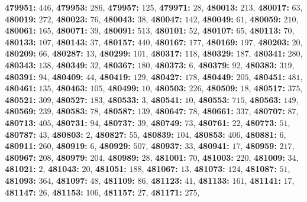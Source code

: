 \textsf{\bfseries 479951:} $446$, \textsf{\bfseries 479953:} $286$, \textsf{\bfseries 479957:} $125$, \textsf{\bfseries 479971:} $28$, \textsf{\bfseries 480013:} $213$, \textsf{\bfseries 480017:} $63$, \textsf{\bfseries 480019:} $272$, \textsf{\bfseries 480023:} $76$, \textsf{\bfseries 480043:} $38$, \textsf{\bfseries 480047:} $142$, \textsf{\bfseries 480049:} $61$, \textsf{\bfseries 480059:} $210$, \textsf{\bfseries 480061:} $165$, \textsf{\bfseries 480071:} $39$, \textsf{\bfseries 480091:} $513$, \textsf{\bfseries 480101:} $52$, \textsf{\bfseries 480107:} $65$, \textsf{\bfseries 480113:} $70$, \textsf{\bfseries 480133:} $107$, \textsf{\bfseries 480143:} $37$, \textsf{\bfseries 480157:} $440$, \textsf{\bfseries 480167:} $177$, \textsf{\bfseries 480169:} $197$, \textsf{\bfseries 480203:} $20$, \textsf{\bfseries 480209:} $66$, \textsf{\bfseries 480287:} $13$, \textsf{\bfseries 480299:} $101$, \textsf{\bfseries 480317:} $118$, \textsf{\bfseries 480329:} $187$, \textsf{\bfseries 480341:} $280$, \textsf{\bfseries 480343:} $138$, \textsf{\bfseries 480349:} $32$, \textsf{\bfseries 480367:} $180$, \textsf{\bfseries 480373:} $6$, \textsf{\bfseries 480379:} $92$, \textsf{\bfseries 480383:} $319$, \textsf{\bfseries 480391:} $94$, \textsf{\bfseries 480409:} $44$, \textsf{\bfseries 480419:} $129$, \textsf{\bfseries 480427:} $178$, \textsf{\bfseries 480449:} $205$, \textsf{\bfseries 480451:} $481$, \textsf{\bfseries 480461:} $135$, \textsf{\bfseries 480463:} $105$, \textsf{\bfseries 480499:} $10$, \textsf{\bfseries 480503:} $226$, \textsf{\bfseries 480509:} $18$, \textsf{\bfseries 480517:} $375$, \textsf{\bfseries 480521:} $309$, \textsf{\bfseries 480527:} $183$, \textsf{\bfseries 480533:} $3$, \textsf{\bfseries 480541:} $10$, \textsf{\bfseries 480553:} $715$, \textsf{\bfseries 480563:} $149$, \textsf{\bfseries 480569:} $239$, \textsf{\bfseries 480583:} $78$, \textsf{\bfseries 480587:} $139$, \textsf{\bfseries 480647:} $78$, \textsf{\bfseries 480661:} $337$, \textsf{\bfseries 480707:} $87$, \textsf{\bfseries 480713:} $405$, \textsf{\bfseries 480731:} $94$, \textsf{\bfseries 480737:} $39$, \textsf{\bfseries 480749:} $73$, \textsf{\bfseries 480761:} $22$, \textsf{\bfseries 480773:} $51$, \textsf{\bfseries 480787:} $43$, \textsf{\bfseries 480803:} $2$, \textsf{\bfseries 480827:} $55$, \textsf{\bfseries 480839:} $104$, \textsf{\bfseries 480853:} $406$, \textsf{\bfseries 480881:} $6$, \textsf{\bfseries 480911:} $260$, \textsf{\bfseries 480919:} $6$, \textsf{\bfseries 480929:} $507$, \textsf{\bfseries 480937:} $33$, \textsf{\bfseries 480941:} $17$, \textsf{\bfseries 480959:} $217$, \textsf{\bfseries 480967:} $208$, \textsf{\bfseries 480979:} $204$, \textsf{\bfseries 480989:} $28$, \textsf{\bfseries 481001:} $70$, \textsf{\bfseries 481003:} $220$, \textsf{\bfseries 481009:} $34$, \textsf{\bfseries 481021:} $2$, \textsf{\bfseries 481043:} $20$, \textsf{\bfseries 481051:} $188$, \textsf{\bfseries 481067:} $13$, \textsf{\bfseries 481073:} $124$, \textsf{\bfseries 481087:} $51$, \textsf{\bfseries 481093:} $364$, \textsf{\bfseries 481097:} $48$, \textsf{\bfseries 481109:} $86$, \textsf{\bfseries 481123:} $41$, \textsf{\bfseries 481133:} $161$, \textsf{\bfseries 481141:} $17$, \textsf{\bfseries 481147:} $26$, \textsf{\bfseries 481153:} $106$, \textsf{\bfseries 481157:} $27$, \textsf{\bfseries 481171:} $275$, 

